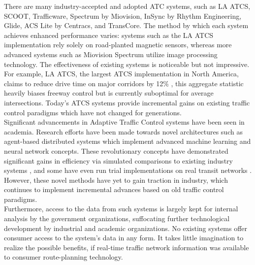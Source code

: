 \documentclass{report}
\begin{document}
There are many industry-accepted and adopted ATC systems, such as LA ATCS, SCOOT, Trafficware, Spectrum by Miovision, InSync by Rhythm Engineering, Glide, ACS Lite by Centracs, and TransCore.
The method by which each system achieves enhanced performance varies: systems such as the LA ATCS implementation rely solely on road-planted magnetic sensors, whereas more advanced systems such as Miovision Spectrum utilize image processing technology.
The effectiveness of existing systems is noticeable but not impressive.
For example, LA ATCS, the largest ATCS implementation in North America, claims to reduce drive time on major corridors by 12\% \cite{la-atcs-article}, this aggregate statistic heavily biases freeway control but is currently suboptimal for average intersections.
Today's ATCS systems provide incremental gains on existing traffic control paradigms which have not changed for generations.\\

Significant advancements in Adaptive Traffic Control systems have been seen in academia.
Research efforts have been made towards novel architectures such as agent-based distributed systems which implement advanced machine learning and neural network concepts.
These revolutionary concepts have demonstrated significant gains in efficiency via simulated comparisons to existing industry systems \cite{1688100, 5073360, uot-article}, and some have even run trial implementations on real transit networks \cite{uot-article}.
However, these novel methods have yet to gain traction in industry, which continues to implement incremental advances based on old traffic control paradigms.\\

Furthermore, access to the data from such systems is largely kept for internal analysis by the government organizations, suffocating further technological development by industrial and academic organizations.
No existing systems offer consumer access to the system's data in any form.
It takes little imagination to realize the possible benefits, if real-time traffic network information was available to consumer route-planning technology.\\
\end{document}
